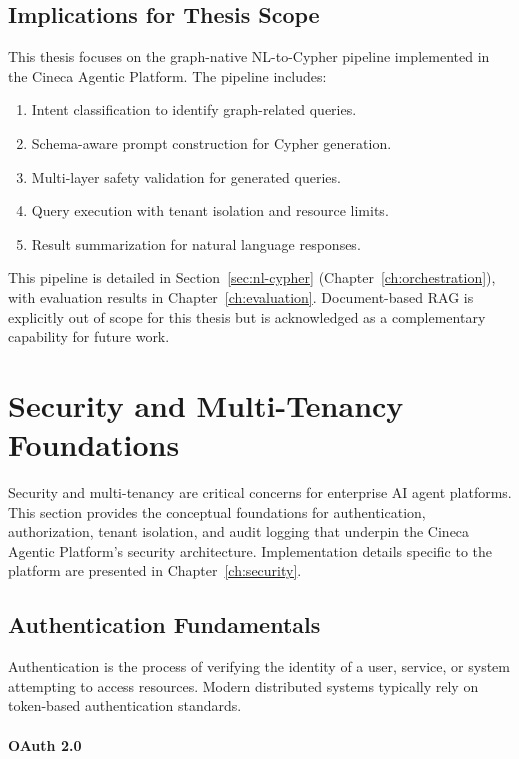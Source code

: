 \documentclass[a4paper,twoside]{sapthesis}
\begin{document}
\subsection{Implications for Thesis Scope}

This thesis focuses on the graph-native NL-to-Cypher pipeline implemented in the Cineca Agentic Platform. The pipeline includes:

\begin{enumerate}
    \item Intent classification to identify graph-related queries.
    \item Schema-aware prompt construction for Cypher generation.
    \item Multi-layer safety validation for generated queries.
    \item Query execution with tenant isolation and resource limits.
    \item Result summarization for natural language responses.
\end{enumerate}

This pipeline is detailed in Section~\ref{sec:nl-cypher} (Chapter~\ref{ch:orchestration}), with evaluation results in Chapter~\ref{ch:evaluation}. Document-based RAG is explicitly out of scope for this thesis but is acknowledged as a complementary capability for future work.

\section{Security and Multi-Tenancy Foundations}
\label{sec:security-foundations}

Security and multi-tenancy are critical concerns for enterprise AI agent platforms. This section provides the conceptual foundations for authentication, authorization, tenant isolation, and audit logging that underpin the Cineca Agentic Platform's security architecture. Implementation details specific to the platform are presented in Chapter~\ref{ch:security}.

\subsection{Authentication Fundamentals}

Authentication is the process of verifying the identity of a user, service, or system attempting to access resources. Modern distributed systems typically rely on token-based authentication standards.

\paragraph{OAuth 2.0}
\end{document}
